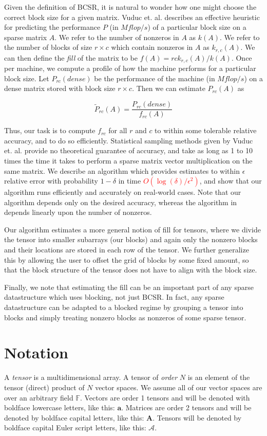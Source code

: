 \documentclass[12pt]{article}
\theoremstyle{dfn}
\numberwithin{equation}{section}
\numberwithin{figure}{section}
\newcommand{\todo}[1] {\textbf{\textcolor{red}{#1}}}
\renewcommand{\vec}[1] {\mathbf{#1}}
\newcommand{\Mat}[1] {\mathbf{#1}}
\newcommand{\Ten}[1] {\mathbf{\mathcal{#1}}}
\newcommand{\F} {\mathbb{F}}
\begin{document}
  Given the definition of BCSR, it is natural to wonder how one might choose the correct block size for a given matrix.
  Vuduc et. al. describes an effective heuristic for predicting the performance $P$ (in $Mflop/s$) of a particular block size on a sparse matrix $A$.
  We refer to the number of nonzeros in $A$ as $k(A)$. We refer to the number of blocks of size $r \times c$ which contain nonzeros in $A$ as $k_{r, c}(A)$.
  We can then define the \textit{fill} of the matrix to be $f(A) = rck_{r, c}(A)/k(A)$.
  Once per machine, we compute a profile of how the machine performs for a particular block size.
  Let $P_{rc}(dense)$ be the performance of the machine (in $Mflop/s$) on a dense matrix stored with block size $r \times c$.
  Then we can estimate $P_{rc}(A)$ as

  \[
    \tilde{P}_{rc}(A) = \frac{P_{rc}(dense)}{f_{rc}(A)}
  \]

  Thus, our task is to compute $f_{rc}$ for all $r$ and $c$ to within some tolerable relative accuracy, and to do so efficiently. Statistical sampling methods given by Vuduc et. al. provide no theoretical guarantee of accuracy, and take as long as 1 to 10 times the time it takes to perform a sparse matrix vector multiplication on the same matrix. We describe an algorithm which provides estimates to within $\epsilon$ relative error with probability $1 - \delta$ in time \todo{$O(\log(\delta)/\epsilon^2)$}, and show that our algorithm runs efficiently and accurately on real-world cases. Note that our algorithm depends only on the desired accuracy, whereas the algorithm in \cite{vuduc2003} depends linearly upon the number of nonzeros.

  Our algorithm estimates a more general notion of fill for tensors, where we divide the tensor into smaller subarrays (our blocks) and again only the nonzero blocks and their locations are stored in each row of the tensor. We further generalize this by allowing the user to offset the grid of blocks by some fixed amount, so that the block structure of the tensor does not have to align with the block size.

  Finally, we note that estimating the fill can be an important part of any sparse datastructure which uses blocking, not just BCSR. In fact, any sparse datastructure can be adapted to a blocked regime by grouping a tensor into blocks and simply treating nonzero blocks as nonzeros of some sparse tensor.

  \section{Notation}
    A \textit{tensor} is a multidimensional array. A tensor of \textit{order} $N$ is an element of the tensor (direct) product of $N$ vector spaces. We assume all of our vector spaces are over an arbitrary field $\F$. Vectors are order 1 tensors and will be denoted with boldface lowercase letters, like this: $\vec{a}$. Matrices are order 2 tensors and will be denoted by boldface capital letters, like this: $\Mat{A}$. Tensors will be denoted by boldface capital Euler script letters, like this: $\Ten{A}$.
\end{document}
